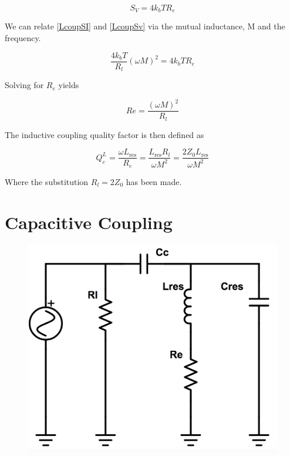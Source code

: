 \documentclass[12pt,reqno]{amsart}
\begin{document}
\begin{equation}
S_V = 4k_bTR_e
\label{LcoupSv}
\end{equation}

We can relate \eqref{LcoupSI} and \eqref{LcoupSv} via the mutual inductance, M and the frequency.

\begin{equation}
\frac{4k_bT}{R_l}(\omega M)^2 = 4k_bTR_e
\end{equation}

Solving for $R_e$ yields

\begin{equation}
Re = \frac{(\omega M)^2}{R_l}
\end{equation}

The inductive coupling quality factor is then defined as

\begin{equation}
Q_c^L = \frac{\omega L_\text{res}}{R_e} = \frac{L_\text{res} R_l}{\omega M^2} = \frac{2 Z_0 L_\text{res}}{\omega M^2}
\end{equation}

Where the substitution $R_l = 2Z_0$ has been made.

\section*{Capacitive Coupling}

\begin{figure}[h!]
\begin{center}
\includegraphics[scale = 0.25]{Ccoupling.png}
\end{center}
\end{figure}
\end{document}

